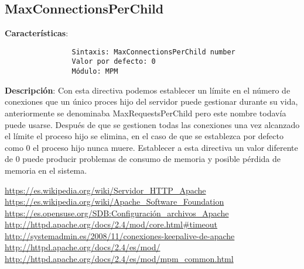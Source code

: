 \documentclass[a4paper, 11pt]{article} %
\begin{document}
	\subsection{MaxConnectionsPerChild}
		\textbf{Características}:
	\begin{verbatim}
				Sintaxis: MaxConnectionsPerChild number
				Valor por defecto: 0
				Módulo: MPM
	\end{verbatim}
	\textbf{Descripción}: Con esta directiva podemos establecer un límite en el número de conexiones que un único proces hijo del servidor puede gestionar durante su vida, anteriormente se denominaba MaxRequestsPerChild pero este nombre todavía puede usarse. Después de que se gestionen todas las conexiones una vez alcanzado el límite el proceso hijo se elimina, en el caso de que se establezca por defecto como 0 el proceso hijo nunca muere. Establecer a esta directiva un valor diferente de 0 puede producir problemas de consumo de memoria y posible pérdida de memoria en el sistema.   

\begin{thebibliography}{X}
	 \url{https://es.wikipedia.org/wiki/Servidor_HTTP_Apache}
	 \url{https://es.wikipedia.org/wiki/Apache_Software_Foundation}
	 \url{https://es.opensuse.org/SDB:Configuración_archivos_Apache}
	 \url{http://httpd.apache.org/docs/2.4/mod/core.html#timeout}
	 \url{http://systemadmin.es/2008/11/conexiones-keepalive-de-apache}
	 \url{http://httpd.apache.org/docs/2.4/es/mod/}
	 \url{http://httpd.apache.org/docs/2.4/es/mod/mpm_common.html}
\end{thebibliography}
\end{document}

